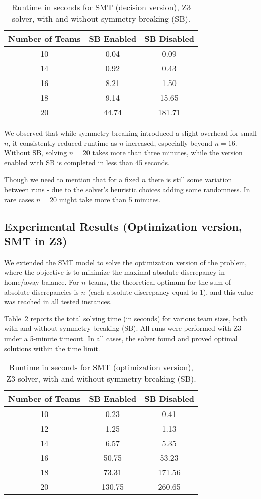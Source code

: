 \documentclass{article}
\begin{document}
\begin{table}[h!]
\centering
\caption{Runtime in seconds for SMT (decision version), Z3 solver, with and without symmetry breaking (SB).}
\label{tab:smt-results}
\begin{tabular}{|c|c|c|}
\hline
\textbf{Number of Teams} & \textbf{SB Enabled} & \textbf{SB Disabled} \\
\hline
10 & 0.04 & 0.09 \\
14 & 0.92 & 0.43 \\
16 & 8.21 & 1.50 \\
18 & 9.14 & 15.65 \\
20 & 44.74 & 181.71 \\
\hline
\end{tabular}
\end{table}

We observed that while symmetry breaking introduced a slight overhead for small $n$, it consistently reduced runtime as $n$ increased, especially beyond $n = 16$. Without SB, solving $n=20$ takes more than three minutes, while the version enabled with SB is completed in less than 45 seconds.

Though we need to mention that for a fixed $n$ there is still some variation between runs - due to the solver's heuristic choices adding some randomness. In rare cases $n=20$ might take more than 5 minutes.

\subsection*{Experimental Results (Optimization version, SMT in Z3)}

We extended the SMT model to solve the optimization version of the problem, where the objective is to minimize the maximal absolute discrepancy in home/away balance. For $n$ teams, the theoretical optimum for the sum of absolute discrepancies is $n$ (each absolute discrepancy equal to $1$), and this value was reached in all tested instances.

Table~\ref{tab:smt-opt-results} reports the total solving time (in seconds) for various team sizes, both with and without symmetry breaking (SB). All runs were performed with Z3 under a 5-minute timeout. In all cases, the solver found and proved optimal solutions within the time limit.

\begin{table}[h!]
\centering
\caption{Runtime in seconds for SMT (optimization version), Z3 solver, with and without symmetry breaking (SB).}
\label{tab:smt-opt-results}
\begin{tabular}{|c|c|c|}
\hline
\textbf{Number of Teams} & \textbf{SB Enabled} & \textbf{SB Disabled} \\
\hline
10 & 0.23 & 0.41 \\
12 & 1.25 & 1.13 \\
14 & 6.57 & 5.35 \\
16 & 50.75 & 53.23 \\
18 & 73.31 & 171.56 \\
20 & 130.75 & 260.65 \\
\hline
\end{tabular}
\end{table}
\end{document}
